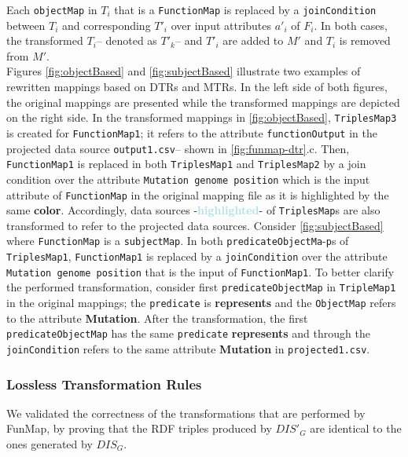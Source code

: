 Each \verb|objectMap| in $T_i$ that is a \verb|FunctionMap| is replaced by a \verb|joinCondition| between $T_i$ and corresponding $T'_i$ over input attributes $a'_i$ of $F_i$. 
In both cases, the transformed $T_i$-- denoted as $T'_k$-- and $T'_i$ are added to $M'$ and $T_i$ is removed from $M'$. \\     
Figures \ref{fig:objectBased} and \ref{fig:subjectBased} illustrate two examples of rewritten mappings based on DTRs and MTRs. In the left side of both figures, the original mappings are presented while the transformed mappings are depicted on the right side. In the transformed mappings in \autoref{fig:objectBased}, \verb|TriplesMap3| is created for \verb|FunctionMap1|; it refers to the attribute \verb|functionOutput| in the projected data source \verb|output1.csv|-- shown in \autoref{fig:funmap-dtr}.c. Then, \verb|FunctionMap1| is replaced in both \verb|TriplesMap1| and \verb|TriplesMap2| by a join condition over the attribute \verb|Mutation genome position| which is the input attribute of \verb|FunctionMap| in the original mapping file as it is highlighted by the same \textcolor{metallicSeaweed}{\textbf{color}}. Accordingly, data sources -\textcolor{powderBlue}{\textbf{highlighted}}- of \verb|TriplesMap|s are also transformed to refer to the projected data sources. 
Consider \autoref{fig:subjectBased} where \verb|FunctionMap| is a \verb|subjectMap|. In both \verb|predicateObjectMa|-\verb|p|s of \verb|TriplesMap1|, \verb|FunctionMap1| is replaced by a \verb|joinCondition| over the attribute \verb|Mutation genome position| that is the input of \verb|FunctionMap1|. To better clarify the performed transformation, consider first \verb|predicateObjectMap| in \verb|TripleMap1| in the original mappings; the \verb|predicate| is \textcolor{burntSienna}{\textbf{represents}} and the \verb|ObjectMap| refers to the attribute \textcolor{metallicSeaweed}{\textbf{Mutation}}. After the transformation, the first \verb|predicateObjectMap| has the same \verb|predicate| \textcolor{burntSienna}{\textbf{represents}} and through the \verb|joinCondition| refers to the same attribute \textcolor{metallicSeaweed}{\textbf{Mutation}} in \verb|projected1.csv|. 

\subsubsection{Lossless Transformation Rules}
\label{subsec:formalEval}
We validated the correctness of the transformations that are performed by FunMap, by proving that the RDF triples produced by $DIS'_G$ are identical to the ones generated by $DIS_G$.

